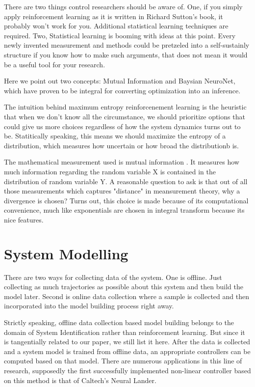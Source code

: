 \documentclass[journal]{IEEEtran}
\begin{document}
There are two things control researchers should be aware of. One, if you simply apply reinforcement learning as it is written in Richard Sutton's book, it probably won't work for you. Additional statistical learning techniques are required. Two, Statistical learning is booming with ideas at this point. Every newly invented measurement and methods could be pretzeled into a self-sustainly structure if you know how to make such arguments, that does not mean it would be a useful tool for your research.

Here we point out two concepts: Mutual Information and Baysian NeuroNet, which have proven to be integral for converting optimization into an inference.



The intuition behind maximum entropy reinforcenement learning is the heuristic that when we don't know all the circumstance, we should prioritize options that could give us more choices regardless of how the system dynamics turns out to be. Statitically speaking, this means we should maximize the entropy of a distribution, which measures how uncertain or how broad the distributionb is.

The mathematical measurement used is mutual information \cite{Kullback1951ONIA}. It measures how much information regarding the random variable X is contained in the distribution of random variable Y. A reasonable question to ask is that out of all those measurements which captures "distance" in meansurement theory, why a divergence is chosen? Turns out, this choice is made because of its computational convenience, much like exponentials are chosen in integral transform because its nice features.



\section{System Modelling}

There are two ways for collecting data of the system. One is offline. Just collecting as much trajectories as possible about this system and then build the model later. Second is online data collection where a sample is collected and then incorporated into the model building process right away.

Strictly speaking, offline data collection based model building belongs to the domain of System Identification rather than reinforcement learning. But since it is tangentially related to our paper, we still list it here. After the data is collected and a system model is trained from offline data, an appropriate controllers can be computed based on that model. There are numerous applications in this line of research, supposedly the first successfully implemented non-linear controller based on this method is that of Caltech's Neural Lander. \cite{Shi2019NeuralLS}
\end{document}
